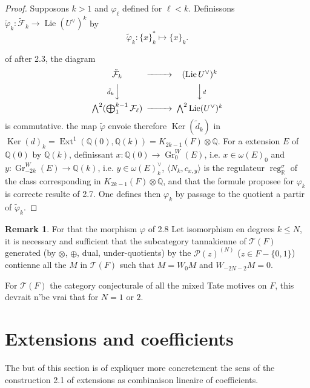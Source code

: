 \documentclass[12pt,a4paper]{article}
\theoremstyle{plain}
\theoremstyle{definition}
\newtheorem{remark}{Remark}[section]
\theoremstyle{remark}
\DeclareMathOperator{\Ext}{Ext}
\DeclareMathOperator*{\Ker}{Ker}
\DeclareMathOperator{\reg}{reg}
\DeclareMathOperator{\Lie}{Lie}
\newcommand{\Q}{\mathbb{Q}}
\newcommand{\R}{\mathbb{R}}
\newcommand{\F}{\mathcal{F}}
\begin{document}
{{\begin{proof}
Supposons $k>1$ and $\varphi_\ell$ defined for $\ell<k$. Definissons $\tilde{\varphi}_k:\tilde{\F}_k\to\Lie(U^\vee)^k$ by
\begin{equation*}
\tilde{\varphi}_k : \{x\}_k^* \longmapsto \{x\}_k.
\end{equation*}

of after 2.3, the diagram
\begin{equation*}
\begin{CD}
\tilde{\F}_k @>>> (\Lie U^\vee)^k \\
@V{\tilde{d}_k}VV @VV{d}V \\
\bigwedge^2(\bigoplus_1^{k-1}\F_\ell) @>>> \bigwedge^2\Lie(U^\vee)^k
\end{CD}
\end{equation*}
is commutative. the map $\tilde{\varphi}$ envoie therefore $\Ker(\tilde{d}_k)$ in $\Ker(d)_k=\Ext^1(\Q(0),\Q(k))=K_{2k-1}(F)\otimes\Q$. For a extension $E$ of $\Q(0)$ by $\Q(k)$, definissant $x:\Q(0)\to\operatorname{Gr}^W_0(E)$, i.e. $x\in\omega(E)_0$ and $y:\operatorname{Gr}^W_{-2k}(E)\to\Q(k)$, i.e. $y\in\omega(E)_k^\vee$, $\langle N_k,c_{x,y}\rangle$ is the regulateur $\reg_\R^\sigma$ of the class corresponding in $K_{2k-1}(F)\otimes\Q$, and that the formule proposee for $\varphi_k$ is correcte resulte of 2.7. One defines then $\varphi_k$ by passage to the quotient {a} partir of $\tilde{\varphi}_k$.
\end{proof}

\begin{remark}
For that the morphism $\varphi$ of 2.8 Let isomorphism en degrees $k\leq N$, it is necessary and sufficient that the subcategory tannakienne of $\mathcal{T}(F)$ generated (by $\otimes$, $\oplus$, dual, under-quotients) by the $\mathcal{P}(z)^{(N)}$ ($z\in F-\{0,1\}$) contienne all the $M$ in $\mathcal{T}(F)$ such that $M=W_0 M$ and $W_{-2N-2}M=0$.

For $\mathcal{T}(F)$ the category conjecturale of all the mixed Tate motives on $F$, this devrait n'be vrai that for $N=1$ or $2$.
\end{remark}


\section{Extensions and coefficients}

The but of this section is of expliquer more concretement the sens of the construction 2.1 of extensions as combinaison lineaire of coefficients.

\subsection{}

}}
\end{document}

